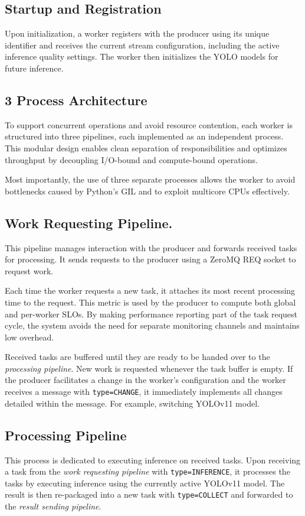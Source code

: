 \subsection{Startup and Registration}
Upon initialization, a worker registers with the producer using its unique identifier and receives the current stream configuration, including the active inference quality settings. The worker then initializes the YOLO models for future inference.

\subsection{3 Process Architecture}
To support concurrent operations and avoid resource contention, each worker is structured into three pipelines, each implemented as an independent process. This modular design enables clean separation of responsibilities and optimizes throughput by decoupling I/O-bound and compute-bound operations.

Most importantly, the use of three separate processes allows the worker to avoid bottlenecks caused by Python’s GIL and to exploit multicore CPUs effectively.

\subsection{Work Requesting Pipeline.}
This pipeline manages interaction with the producer and forwards received tasks for processing. It sends requests to the producer using a ZeroMQ REQ socket to request work. 

Each time the worker requests a new task, it attaches its most recent processing time to the request. This metric is used by the producer to compute both global and per-worker SLOs. By making performance reporting part of the task request cycle, the system avoids the need for separate monitoring channels and maintains low overhead.

Received tasks are buffered until they are ready to be handed over to the \textit{processing pipeline}. New work is requested whenever the task buffer is empty. If the producer facilitates a change in the worker's configuration and the worker receives a message with \texttt{type=CHANGE}, it immediately implements all changes detailed within the message. For example, switching YOLOv11 model.

\subsection{Processing Pipeline}
This process is dedicated to executing inference on received tasks. Upon receiving a task from the \textit{work requesting pipeline} with \texttt{type=INFERENCE}, it processes the tasks by executing inference using the currently active YOLOv11 model. The result is then re-packaged into a new task with \texttt{type=COLLECT} and forwarded to the \textit{result sending pipeline}.


